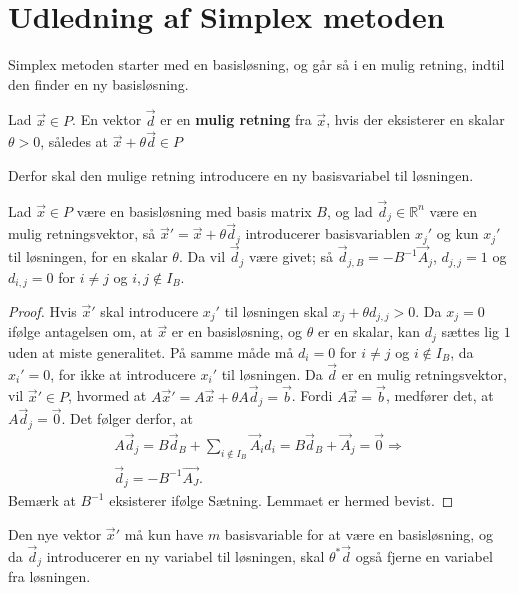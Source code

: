 \section{Udledning af Simplex metoden}
Simplex metoden starter med en basisløsning, og går så i en mulig retning, indtil den finder en ny basisløsning.

\begin{defn}
Lad $\vec{x} \in P$. En vektor $\vec{d}$ er en \textbf{mulig retning} fra $\vec{x}$, hvis der eksisterer en skalar $\theta > 0$, således at $\vec{x}+\theta\vec{d} \in P$ 
\end{defn}

Derfor skal den mulige retning introducere en ny basisvariabel til løsningen.

\begin{lma}
Lad $\vec{x} \in P$ være en basisløsning med basis matrix $B$, og lad $\vec{d}_j  \in \mathds{R}^n$ være en mulig retningsvektor, så $\vec{x}' = \vec{x}+ \theta\vec{d}_j$ introducerer basisvariablen $x_j'$ og kun $x_j'$ til løsningen, for en skalar $\theta$.
Da vil $\vec{d}_j$ være givet; så $\vec{d}_{j,B} = -B^{-1}\vec{A}_j$, $d_{j,j} = 1$ og $d_{i,j} = 0$ for $i \neq j$ og $ i,j \notin I_B$.
\label{lma:retningsvektor}
\end{lma}

\begin{proof}
Hvis $\vec{x}'$ skal introducere $x_j'$ til løsningen skal $x_j + \theta d_{j,j} > 0$. 
Da $x_j = 0$ ifølge antagelsen om, at $\vec{x}$ er en basisløsning, og $\theta$ er en skalar, kan $d_j$ sættes lig $1$ uden at miste generalitet. 
På samme måde må $d_i = 0$ for $i \neq j$ og $i \notin I_B$, da $x_i' = 0$, for ikke at introducere $x_i'$ til løsningen.
Da $\vec{d}$ er en mulig retningsvektor, vil $\vec{x}' \in P$, hvormed at $A\vec{x}' = A\vec{x}+ \theta A\vec{d}_j = \vec{b}$. 
Fordi $A\vec{x} = \vec{b}$, medfører det, at $A\vec{d}_j = \vec{0}$.
Det følger derfor, at
\begin{align*}
A\vec{d}_j = B \vec{d}_B + \sum_{i \notin I_B} \vec{A}_id_i = B\vec{d}_B + \vec{A}_j = \vec{0} \Rightarrow
\\ \vec{d}_j = -B^{-1}\vec{A_J}.
\end{align*}
Bemærk at $B^{-1}$ eksisterer ifølge Sætning. 
Lemmaet er hermed bevist.
\end{proof}

Den nye vektor $\vec{x}'$ må kun have $m$ basisvariable for at være en basisløsning, og da $\vec{d}_j$ introducerer en ny variabel til løsningen, skal $\theta^*\vec{d}$ også fjerne en variabel fra  løsningen.

